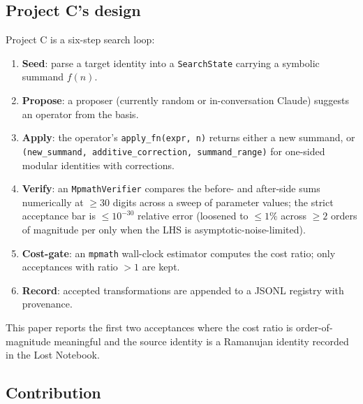 \documentclass[11pt,reqno]{amsart}
\theoremstyle{definition}
\begin{document}
\subsection{Project C's design}\label{sec:design}

Project C is a six-step search loop:
\begin{enumerate}
\item \textbf{Seed}: parse a target identity into a
  \verb|SearchState| carrying a symbolic summand $f(n)$.
\item \textbf{Propose}: a proposer (currently random or
  in-conversation Claude) suggests an operator from the basis.
\item \textbf{Apply}: the operator's \verb|apply_fn(expr, n)| returns
  either a new summand, or
  \verb|(new_summand, additive_correction, summand_range)| for
  one-sided modular identities with corrections.
\item \textbf{Verify}: an \verb|MpmathVerifier| compares the before-
  and after-side sums numerically at $\ge 30$ digits across a sweep
  of parameter values; the strict acceptance bar is $\le 10^{-30}$
  relative error (loosened to $\le 1\%$ across $\ge 2$ orders of
  magnitude per \cite[CLAUDE.md gotcha~6]{ProjectC} only when the
  LHS is asymptotic-noise-limited).
\item \textbf{Cost-gate}: an \texttt{mpmath} wall-clock estimator
  computes the cost ratio; only acceptances with ratio $> 1$ are
  kept.
\item \textbf{Record}: accepted transformations are appended to a
  JSONL registry with provenance.
\end{enumerate}
This paper reports the first two acceptances where the cost ratio is
order-of-magnitude meaningful and the source identity is a Ramanujan
identity recorded in the Lost Notebook.

\subsection{Contribution}\label{sec:contribution}
\end{document}
